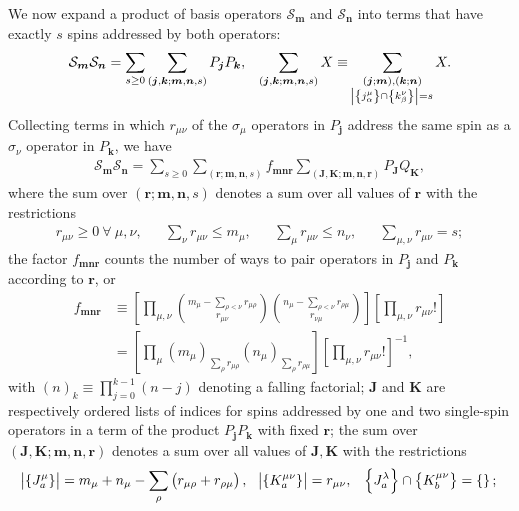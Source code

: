 \documentclass[aps,notitlepage,nofootinbib,11pt]{revtex4-1}
\newcommand{\p}[1]{\left(#1\right)} %
\renewcommand{\sp}[1]{\left[#1\right]} %
\renewcommand{\set}[1]{\left\{#1\right\}} %
\renewcommand{\v}{\bm} %
\renewcommand{\S}{\mathcal{S}}
\newcommand{\1}{\mathds{1}}
\begin{document}
We now expand a product of basis operators $\S_{\v m}$ and $\S_{\v n}$
into terms that have exactly $s$ spins addressed by both operators:
\begin{align}
  \S_{\v m} \S_{\v n}
  = \sum_{s\ge0} \sum_{\p{\v j,\v k;\v m,\v n,s}} P_{\v j} P_{\v k},
  &&
  \sum_{\p{\v j,\v k;\v m,\v n,s}} X \equiv
  \sum_{\substack{\p{\v j;\v m},\p{\v k;\v n} \\
      \abs{\set{j_\alpha^\mu}\cap\set{k_\beta^\nu}}=s}} X.
  \label{eq:SS_PP}
\end{align}
Collecting terms in which $r_{\mu\nu}$ of the $\sigma_\mu$ operators
in $P_{\v j}$ address the same spin as a $\sigma_\nu$ operator in
$P_{\v k}$, we have
\begin{align}
  \S_{\v m}\S_{\v n}
  = \sum_{s\ge0} \sum_{\p{\v r;\v m,\v n,s}} f_{\v m\v n\v r}
  \sum_{\p{\v J,\v K;\v m,\v n,\v r}} P_{\v J} Q_{\v K},
  \label{eq:SS_PQ}
\end{align}
where the sum over $\p{\v r;\v m,\v n,s}$ denotes a sum over all
values of $\v r$ with the restrictions
\begin{align}
  r_{\mu\nu} \ge 0 ~\forall~ \mu,\nu,
  &&
  \sum_\nu r_{\mu\nu} \le m_\mu,
  &&
  \sum_\mu r_{\mu\nu} \le n_\nu,
  &&
  \sum_{\mu,\nu} r_{\mu\nu} = s;
  \label{eq:rest_r}
\end{align}
the factor $f_{\v m\v n\v r}$ counts the number of ways to pair
operators in $P_{\v j}$ and $P_{\v k}$ according to $\v r$, or
\begin{align}
  f_{\v m\v n\v r}
  &\equiv \sp{\prod_{\mu,\nu}
    { m_\mu - \sum_{\rho<\nu} r_{\mu\rho} \choose r_{\mu\nu} }
    { n_\mu - \sum_{\rho<\nu} r_{\rho\mu} \choose r_{\nu\mu} }}
  \sp{\prod_{\mu,\nu} r_{\mu\nu}!} \\
  &= \sp{\prod_\mu \p{m_\mu}_{\sum_\rho r_{\mu\rho}}
    \p{n_\mu}_{\sum_\rho r_{\rho\mu}}}
  \sp{\prod_{\mu,\nu} r_{\mu\nu}!}^{-1},
\end{align}
with $\p{n}_k\equiv\prod_{j=0}^{k-1}\p{n-j}$ denoting a falling
factorial; $\v J$ and $\v K$ are respectively ordered lists of indices
for spins addressed by one and two single-spin operators in a term of
the product $P_{\v j} P_{\v k}$ with fixed $\v r$; the sum over
$\p{\v J,\v K;\v m,\v n,\v r}$ denotes a sum over all values of
$\v J,\v K$ with the restrictions
\begin{align}
  \abs{\set{J_a^\mu}}
  = m_\mu + n_\mu - \sum_\rho\p{r_{\mu\rho}+r_{\rho\mu}},
  &&
  \abs{\set{K^{\mu\nu}_a}} = r_{\mu\nu},
  &&
  \set{J_a^\lambda} \cap \set{K_b^{\mu\nu}} = \set{};
\end{align}
\end{document}
